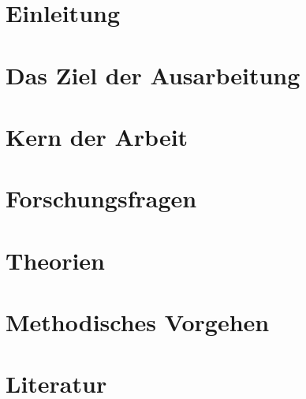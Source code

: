 \documentclass[12pt]{article}
\begin{document}
    
    \newpage

    \tableofcontents
    \newpage

    \section{Einleitung}
        
    
    \section{Das Ziel der Ausarbeitung} 
        

    \section{Kern der Arbeit}
            

    \newpage    
    
    \section{Forschungsfragen}
        
    
    \section{Theorien}
        
    
    \section{Methodisches Vorgehen}
         
    \newpage
    
    \section{Literatur}
    	\printbibliography
    	
    \newpage
    \cite{}
\end{document}
